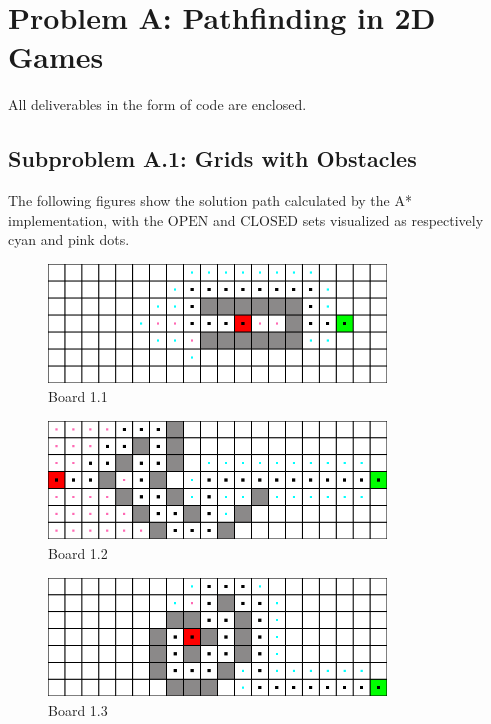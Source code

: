 \section{Problem A: Pathfinding in 2D Games}

All deliverables in the form of code are enclosed.

\subsection*{Subproblem A.1: Grids with Obstacles}

The following figures show the solution path calculated by the A* implementation,
with the $\text{OPEN}$ and $\text{CLOSED}$ sets visualized as respectively cyan
and pink dots.

\begin{figure}[h!]
  \centering
    \includegraphics[width=0.8\textwidth]{img/board-1-1-astar}
    \caption{Board 1.1}
\end{figure}

\begin{figure}[h!]
  \centering
    \includegraphics[width=0.8\textwidth]{img/board-1-2-astar}
    \caption{Board 1.2}
\end{figure}

\begin{figure}[h!]
  \centering
    \includegraphics[width=0.8\textwidth]{img/board-1-3-astar}
    \caption{Board 1.3}
\end{figure}

